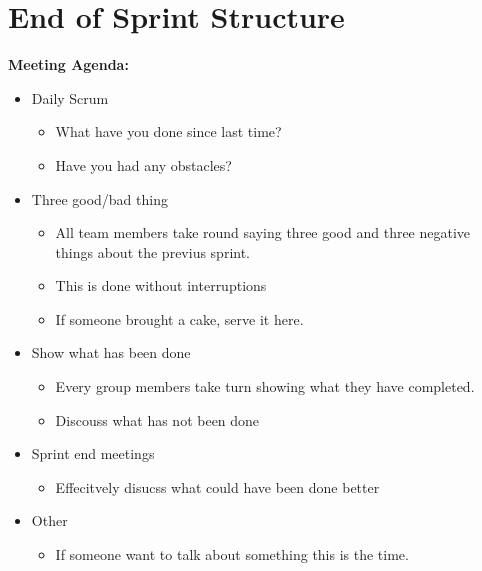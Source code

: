 \section{End of Sprint Structure}

\begin{framed}
\textbf{Meeting Agenda: }
\begin{itemize}
    \item Daily Scrum
    \begin{itemize}
        \item What have you done since last time?
        \item Have you had any obstacles? 
    \end{itemize}

    \item Three good/bad thing
    \begin{itemize}
        \item All team members take round saying three good and three negative things
        about the previus sprint. 
        \item This is done without interruptions
        \item If someone brought a cake, serve it here.
    \end{itemize}

    \item Show what has been done
    \begin{itemize}
        \item Every group members take turn showing what they have completed. 
        \item Discouss what has not been done
    \end{itemize}
        
    \item Sprint end meetings
    \begin{itemize}
        \item Effecitvely disucss what could have been done better
    \end{itemize}

    \item Other
    \begin{itemize}
        \item If someone want to talk about something this is the time.
    \end{itemize}


\end{itemize}
\end{framed}

